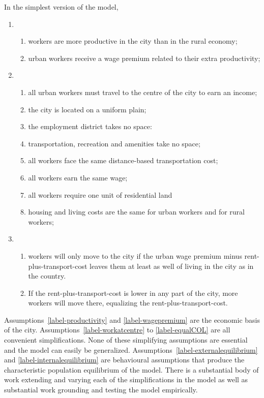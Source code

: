 In the simplest version of the model,
\begin{enumerate}
    \item 
    \begin{enumerate}\item \label{label-productivity}workers are more productive in the city than in the rural economy;
    \item \label{label-wagepremium}urban  workers receive a wage premium related to their extra productivity;  
    \end{enumerate}
    \item \begin{enumerate}\item\label{label-workatcentre}all urban workers must travel to the centre of the city to earn an income;
    \item \label{label-uniformplain}the city is located on a uniform plain; 
    \item \label{label-emplymentspace}the employment district takes no space:
    \item \label{label-transportspace}transportation, recreation and amenities take no space;
    \item \label{label-equaltransportcost}all workers face the same distance-based transportation cost;
    \item \label{label-equalwage}all workers earn the same wage;
    \item \label{label-equalland}all workers require one unit of residential land
    \item \label{label-equalCOL}housing and living costs are the same for urban workers and for rural workers;
    \end{enumerate}
    \item \begin{enumerate}\item\label{label-externalequilibrium}workers will only move to the city  if the \gls{urban wage premium} minus rent-plus-transport-cost leaves them at least as well of living in the city as  in the country.
    \item \label{label-internalequilibrium}If the rent-plus-transport-cost is lower in any part of the city, more workers will move there, equalizing the rent-plus-transport-cost.
    \end{enumerate}
\end{enumerate}

Assumptions~\ref{label-productivity} and \ref{label-wagepremium} are the economic basis of the city. Assumptions~\ref{label-workatcentre}  to \ref{label-equalCOL} are all convenient simplifications. None of these simplifying assumptions are essential and the model can easily be generalized. %
Assumptions~\ref{label-externalequilibrium} and \ref{label-internalequilibrium} are behavioural assumptions that produce the characteristic population \gls{equilibrium} of the model. There is a substantial body of work extending and varying each of the simplifications in the model as well as substantial work grounding and testing the model empirically.


